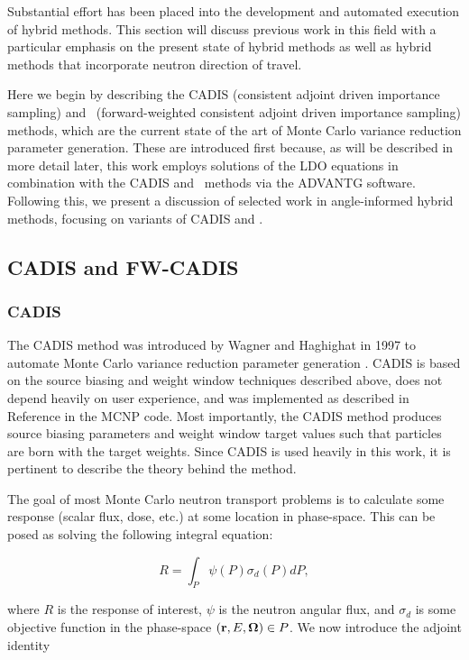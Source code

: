 Substantial effort has been placed into the development and automated execution of
hybrid methods. This section will discuss previous work in this field with a 
particular emphasis on the present state of hybrid methods as well as hybrid methods 
that incorporate neutron direction of travel.

Here we begin by describing the CADIS (consistent adjoint driven importance sampling)
and \fwc\ (forward-weighted consistent adjoint driven importance sampling) methods, 
which are the current state
of the art of Monte Carlo variance reduction parameter generation. These are 
introduced first because, as will be described in more detail later, this work 
employs solutions of the LDO equations in combination with the CADIS and \fwc\ 
methods via the ADVANTG software. Following this, we present a discussion of selected 
work in angle-informed hybrid methods, focusing on variants of CADIS and \fwc.

\subsection{CADIS and FW-CADIS}

\subsubsection{CADIS}
\label{sec:cadis}

The CADIS method was introduced by Wagner and Haghighat in 1997 to automate Monte 
Carlo variance reduction parameter generation \cite{cadis}. CADIS is based on the 
source biasing and weight window techniques described above, does not depend heavily 
on user experience, and was implemented as described in Reference \cite{cadis} in the 
MCNP \cite{mcnp} code. Most importantly, the CADIS method produces source biasing 
parameters and weight window target values such that particles are born with the target
weights. Since CADIS is used heavily in this work, it is pertinent to 
describe the theory behind the method.

The goal of most Monte Carlo neutron transport problems is to calculate some response
(scalar flux, dose, etc.) at some location in phase-space. This can be posed as 
solving the following integral equation:

\begin{equation}
R = \int_P \psi(P)\sigma_d(P)dP,
\label{eq:cadis_r1}
\end{equation}

\noindent where $R$ is the response of interest, $\psi$ is the neutron angular flux,
and $\sigma_d$ is some objective function in the phase-space $(\textbf{r}, E, \mathbf\Omega) \in P$.
We now introduce the adjoint identity

